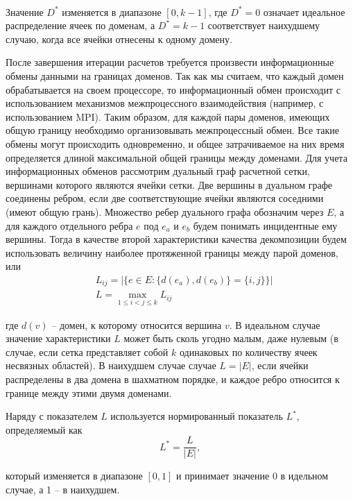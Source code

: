 \

Значение $D^{*}$ изменяется в диапазоне $[0, k - 1]$, где $D^{*} = 0$ означает идеальное распределение ячеек по доменам, а $D^{*} = k - 1$ соответствует наихудшему случаю, когда все ячейки отнесены к одному домену.

После завершения итерации расчетов требуется произвести информационные обмены данными на границах доменов.
Так как мы считаем, что каждый домен обрабатывается на своем процессоре, то информационный обмен происходит с использованием механизмов межпроцессного взаимодействия (например, с использованием MPI).
Таким образом, для каждой пары доменов, имеющих общую границу необходимо организовывать межпроцессный обмен.
Все такие обмены могут происходить одновременно, и общее затрачиваемое на них время определяется длиной максимальной общей границы между доменами.
Для учета информационных обменов рассмотрим дуальный граф расчетной сетки, вершинами которого являются ячейки сетки.
Две вершины в дуальном графе соединены ребром, если две соответствующие ячейки являются соседними (имеют общую грань).
Множество ребер дуального графа обозначим через $E$, а для каждого отдельного ребра $e$ под $e_a$ и $e_b$ будем понимать инцидентные ему вершины.
Тогда в качестве второй характеристики качества декомпозиции будем использовать величину наиболее протяженной границы между парой доменов, или
\begin{equation}
	\begin{aligned}
		& L_{ij} = \left| \{ e \in E: \{ d(e_a), d(e_b) \} = \{ i, j \} \} \right| \\
		& L = \max_{1 \le i < j \le k}{L_{ij}}
	\end{aligned}
\end{equation}

где $d(v)$ -- домен, к которому относится вершина $v$.
В идеальном случае значение характеристики $L$ может быть сколь угодно малым, даже нулевым (в случае, если сетка представляет собой $k$ одинаковых по количеству ячеек несвязных областей).
В наихудшем случае случае $L = |E|$, если ячейки распределены в два домена в шахматном порядке, и каждое ребро относится к границе между этими двумя доменами.

Наряду с показателем $L$ используется нормированный показатель $L^{*}$, определяемый как
\begin{equation}
	L^{*} = \frac{L}{|E|},
\end{equation}

который изменяется в диапазоне $[0, 1]$ и принимает значение 0 в идельном случае, а 1 -- в наихудшем.

